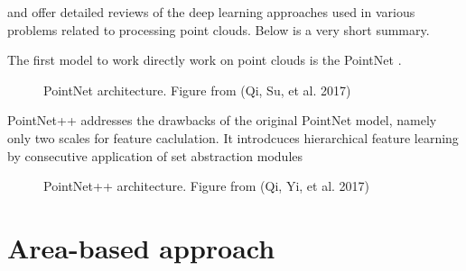 \cite{belloReviewDeepLearning2020} and \cite{guoDeepLearning3D2021} offer detailed reviews of the deep learning approaches used in various problems related to processing point clouds.
Below is a very short summary.

The first model to work directly work on point clouds is the PointNet \cite{qiPointNet2017}.

\begin{figure}
\caption{\label{fig-pointnet-architecture}PointNet architecture. Figure
from (Qi, Su, et al. 2017)}
\end{figure}

PointNet++ \cite{qiPointNetPlusPlus2017} addresses the drawbacks of the original PointNet model, namely only two scales for feature caclulation.
It introdcuces hierarchical feature learning by consecutive application of set abstraction modules

\begin{figure}
\caption{\label{fig-pointnet2-architecture}PointNet++ architecture.
Figure from (Qi, Yi, et al. 2017)}
\end{figure}

\section{Area-based approach}\label{sec-area-based-approach}

